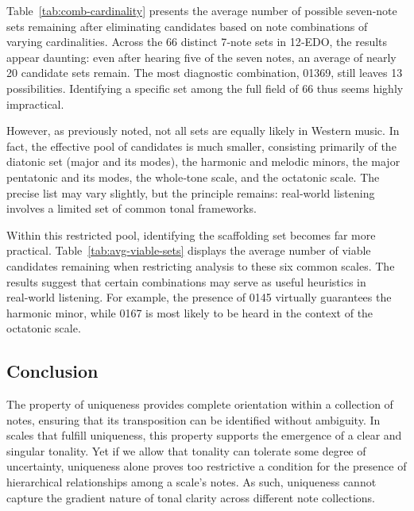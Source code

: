 \documentclass[10pt,twocolumn]{article}
\numberwithin{equation}{section} %
\begin{document}
    Table~\ref{tab:comb-cardinality} presents the average number of possible seven‑note sets remaining after eliminating candidates based on note combinations of varying cardinalities.
    Across the 66 distinct 7‑note sets in 12‑EDO, the results appear daunting: even after hearing five of the seven notes, an average of nearly 20 candidate sets remain.
    The most diagnostic combination, 01369, still leaves 13 possibilities.
    Identifying a specific set among the full field of 66 thus seems highly impractical.

    

    However, as previously noted, not all sets are equally likely in Western music.
    In fact, the effective pool of candidates is much smaller, consisting primarily of the diatonic set (major and its modes), the harmonic and melodic minors, the major pentatonic and its modes, the whole‑tone scale, and the octatonic scale.
    The precise list may vary slightly, but the principle remains: real‑world listening involves a limited set of common tonal frameworks.

    Within this restricted pool, identifying the scaffolding set becomes far more practical.
    Table~\ref{tab:avg-viable-sets} displays the average number of viable candidates remaining when restricting analysis to these six common scales.
    The results suggest that certain combinations may serve as useful heuristics in real‑world listening.
    For example, the presence of 0145 virtually guarantees the harmonic minor, while 0167 is most likely to be heard in the context of the octatonic scale.

    

    \subsection{Conclusion}

    The property of uniqueness provides complete orientation within a collection of notes, ensuring that its transposition can be identified without ambiguity.
    In scales that fulfill uniqueness, this property supports the emergence of a clear and singular tonality.
    Yet if we allow that tonality can tolerate some degree of uncertainty, uniqueness alone proves too restrictive a condition for the presence of hierarchical relationships among a scale's notes.
    As such, uniqueness cannot capture the gradient nature of tonal clarity across different note collections.
\end{document}
